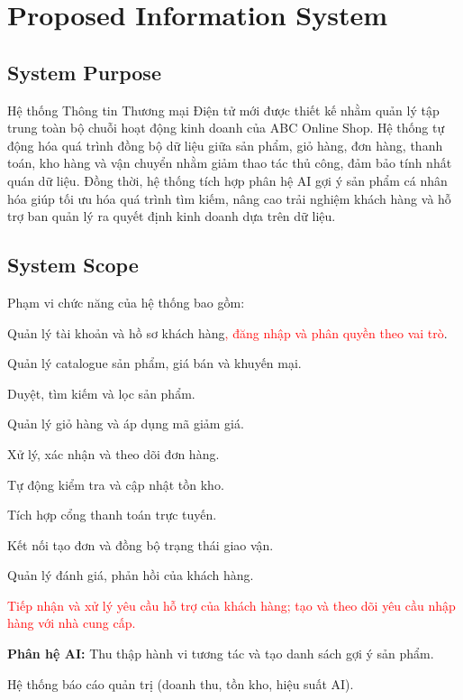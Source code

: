 \documentclass[12pt,a4paper,oneside]{report}
\newif\ifmark \marktrue
\newcommand{\chg}[1]{\ifmark\textcolor{red}{#1}\else #1\fi}
\begin{document}
\section{Proposed Information System}

\subsection{System Purpose}

Hệ thống Thông tin Thương mại Điện tử mới được thiết kế nhằm quản lý tập trung toàn bộ chuỗi hoạt động kinh doanh của ABC Online Shop. Hệ thống tự động hóa quá trình đồng bộ dữ liệu giữa sản phẩm, giỏ hàng, đơn hàng, thanh toán, kho hàng và vận chuyển nhằm giảm thao tác thủ công, đảm bảo tính nhất quán dữ liệu. Đồng thời, hệ thống tích hợp phân hệ AI gợi ý sản phẩm cá nhân hóa giúp tối ưu hóa quá trình tìm kiếm, nâng cao trải nghiệm khách hàng và hỗ trợ ban quản lý ra quyết định kinh doanh dựa trên dữ liệu.

\subsection{System Scope}

Phạm vi chức năng của hệ thống bao gồm:

\begin{itemize}
  \item Quản lý tài khoản và hồ sơ khách hàng\chg{, đăng nhập và phân quyền theo vai trò}.
  \item Quản lý catalogue sản phẩm, giá bán và khuyến mại.
  \item Duyệt, tìm kiếm và lọc sản phẩm.
  \item Quản lý giỏ hàng và áp dụng mã giảm giá.
  \item Xử lý, xác nhận và theo dõi đơn hàng.
  \item Tự động kiểm tra và cập nhật tồn kho.
  \item Tích hợp cổng thanh toán trực tuyến.
  \item Kết nối tạo đơn và đồng bộ trạng thái giao vận.
  \item Quản lý đánh giá, phản hồi của khách hàng.
  \chg{\item Tiếp nhận và xử lý yêu cầu hỗ trợ của khách hàng; tạo và theo dõi yêu cầu nhập hàng với nhà cung cấp.}
  \item \textbf{Phân hệ AI:} Thu thập hành vi tương tác và tạo danh sách gợi ý sản phẩm.
  \item Hệ thống báo cáo quản trị (doanh thu, tồn kho, hiệu suất AI).
\end{itemize}
\end{document}
